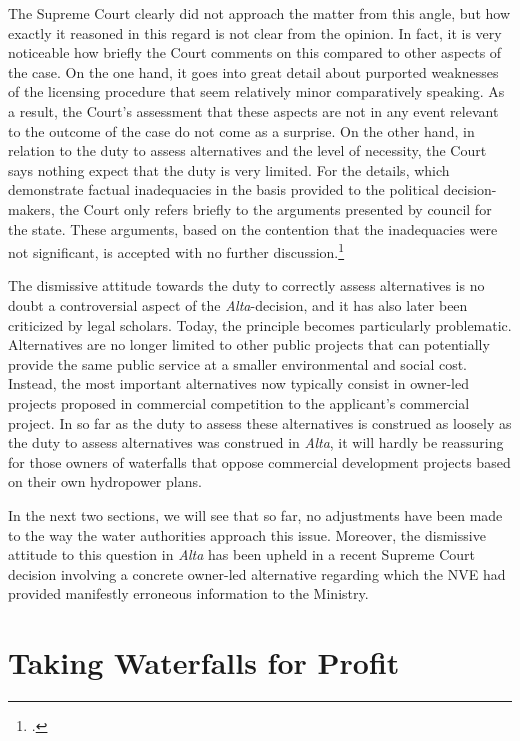 The Supreme Court clearly did not approach the matter from this angle, but how exactly it reasoned in this regard is not clear from the opinion. In fact, it is very noticeable how briefly the Court comments on this compared to other aspects of the case. On the one hand, it goes into great detail about purported weaknesses of the licensing procedure that seem relatively minor comparatively speaking. As a result, the Court's assessment that these aspects are not in any event relevant to the outcome of the case do not come as a surprise. On the other hand, in relation to the duty to assess alternatives and the level of necessity, the Court says nothing expect that the duty is very limited. For the details, which demonstrate factual inadequacies in the basis provided to the political decision-makers, the Court only refers briefly to the arguments presented by council for the state. These arguments, based on the contention that the inadequacies were not significant, is accepted with no further discussion.\footcite[346]{alta82}

The dismissive attitude towards the duty to correctly assess alternatives is no doubt a controversial aspect of the {\it Alta}-decision, and it has also later been criticized by legal scholars. Today, the principle becomes particularly problematic. Alternatives are no longer limited to other public projects that can potentially provide the same public service at a smaller environmental and social cost. Instead, the most important alternatives now typically consist in owner-led projects proposed in commercial competition to the applicant's commercial project. In so far as the duty to assess these alternatives is construed as loosely as the duty to assess alternatives was construed in {\it Alta}, it will hardly be reassuring for those owners of waterfalls that oppose commercial development projects based on their own hydropower plans. 

In the next two sections, we will see that so far, no adjustments have been made to the way the water authorities approach this issue. Moreover, the dismissive attitude to this question in {\it Alta} has been upheld in a recent Supreme Court decision involving a concrete owner-led alternative regarding which the NVE had provided manifestly erroneous information to the Ministry.

\section{Taking Waterfalls for Profit}


